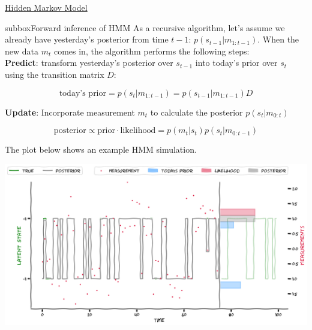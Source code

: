 \begin{textbox}{\href{http://instructor.compneuro.neuromatch.io/tutorials/W3D2_HiddenDynamics/instructor/W3D2_Tutorial2.html}{Hidden Markov Model }   }

\begin{subbox}{subbox}{Forward inference of HMM}
\scriptsize
As a recursive algorithm, let's assume we already have yesterday's posterior from time $t-1$: $p(s_{t-1}|m_{1:t-1})$. When the new data $m_{t}$ comes in, the algorithm performs the following steps:\\

\textbf{Predict}: transform yesterday's posterior over $s_{t-1}$ into today's prior over $s_t$ using the transition matrix $D$:

\begin{equation*}
\text{today's prior}=p(s_t|m_{1:t-1})= p(s_{t-1}|m_{1:t-1}) D
\end{equation*}

\textbf{Update}: Incorporate measurement $m_t$ to calculate the posterior $p(s_t|m_{0:t})$

\begin{equation*}
\text{posterior} \propto \text{prior}\cdot \text{likelihood}=p(m_t|s_t)p(s_t|m_{0:t-1})
\end{equation*}


The plot below shows an example HMM simulation. 
\begin{center}
    
\includegraphics[scale=0.25]{Figures/HD/HD_Figure5.png}
\end{center}
\end{subbox}




\end{textbox}
\newpage
